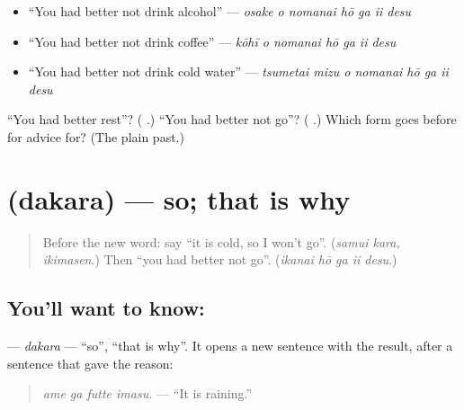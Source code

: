 \begin{itemize}
\raggedright
  \item \textquotedblleft{}You had better not drink alcohol\textquotedblright{} — \emph{osake o nomanai hō ga ii desu}
  \item \textquotedblleft{}You had better not drink coffee\textquotedblright{} — \emph{kōhī o nomanai hō ga ii desu}
  \item \textquotedblleft{}You had better not drink cold water\textquotedblright{} — \emph{tsumetai mizu o nomanai hō ga ii desu}
\end{itemize}

\begin{tcolorbox}[breakable,colback=teal!4,colframe=teal!35!black,title={Before you move on}]
\textquotedblleft{}You had better rest\textquotedblright{}? (\textbf{  }.) \textquotedblleft{}You had better not go\textquotedblright{}? (\textbf{  }.) Which form goes before \textbf{} for advice for? (The plain past.)
\end{tcolorbox}
\section[\texorpdfstring{\ja{だから} (dakara)}{だから (dakara)}]{ (dakara) — so; that is why}

\label{lesson:JA-C255-dakara}



\begin{quote}
Before the new word: say \textquotedblleft{}it is cold, so I won't go\textquotedblright{}. (\emph{samui kara, ikimasen}.) Then \textquotedblleft{}you had better not go\textquotedblright{}. (\emph{ikanai hō ga ii desu}.)
\end{quote}

\subsection*{You'll want to know: }
\textbf{} — \emph{dakara} — \textquotedblleft{}so\textquotedblright{}, \textquotedblleft{}that is why\textquotedblright{}. It opens a new sentence with the result, after a sentence that gave the reason:

\begin{quote}
\textbf{ }
\end{quote}

\begin{quote}
\emph{ame ga futte imasu.} — \textquotedblleft{}It is raining.\textquotedblright{}
\end{quote}


